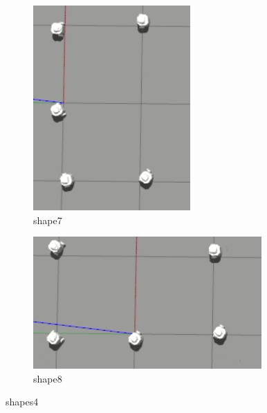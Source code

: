 \documentclass[12pt]{extarticle}
\begin{document}
\begin{figure}[H]
\centering
\begin{subfigure}{.5\textwidth}
  \centering
  \includegraphics[width=.8\linewidth]{shape7}
  \caption{shape7}
  \label{fig:sub1}
\end{subfigure}%
\begin{subfigure}{.5\textwidth}
  \centering
  \includegraphics[width=.8\linewidth]{shape8}
  \caption{shape8}
  \label{fig:sub2}
\end{subfigure}
\caption{shapes4}
\label{fig:test}



\end{figure}
\end{document}
